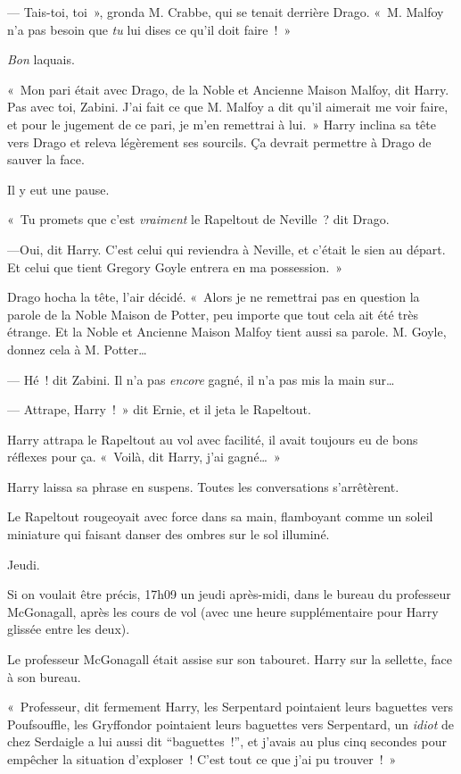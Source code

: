 --- Tais-toi, toi~», gronda M. Crabbe, qui se tenait derrière Drago. «~M. Malfoy n'a pas besoin que \emph{tu} lui dises ce qu'il doit faire~!~»

\emph{Bon} laquais.

«~Mon pari était avec Drago, de la Noble et Ancienne Maison Malfoy, dit Harry. Pas avec toi, Zabini. J'ai fait ce que M. Malfoy a dit qu'il aimerait me voir faire, et pour le jugement de ce pari, je m'en remettrai à lui.~» Harry inclina sa tête vers Drago et releva légèrement ses sourcils. Ça devrait permettre à Drago de sauver la face.

Il y eut une pause.

«~Tu promets que c'est \emph{vraiment} le Rapeltout de Neville~? dit Drago.

---Oui, dit Harry. C'est celui qui reviendra à Neville, et c'était le sien au départ. Et celui que tient Gregory Goyle entrera en ma possession.~»

Drago hocha la tête, l'air décidé. «~Alors je ne remettrai pas en question la parole de la Noble Maison de Potter, peu importe que tout cela ait été très étrange. Et la Noble et Ancienne Maison Malfoy tient aussi sa parole. M. Goyle, donnez cela à M. Potter…

--- Hé~! dit Zabini. Il n'a pas \emph{encore} gagné, il n'a pas mis la main sur…

--- Attrape, Harry~!~» dit Ernie, et il jeta le Rapeltout.

Harry attrapa le Rapeltout au vol avec facilité, il avait toujours eu de bons réflexes pour ça. «~Voilà, dit Harry, j'ai gagné…~»

Harry laissa sa phrase en suspens. Toutes les conversations s'arrêtèrent.

Le Rapeltout rougeoyait avec force dans sa main, flamboyant comme un soleil miniature qui faisant danser des ombres sur le sol illuminé.

\later

Jeudi.

Si on voulait être précis, 17h09 un jeudi après-midi, dans le bureau du professeur McGonagall, après les cours de vol (avec une heure supplémentaire pour Harry glissée entre les deux).

Le professeur McGonagall était assise sur son tabouret. Harry sur la sellette, face à son bureau.

«~Professeur, dit fermement Harry, les Serpentard pointaient leurs baguettes vers Poufsouffle, les Gryffondor pointaient leurs baguettes vers Serpentard, un \emph{idiot} de chez Serdaigle a lui aussi dit “baguettes~!”, et j'avais au plus cinq secondes pour empêcher la situation d'exploser~! C'est tout ce que j'ai pu trouver~!~»

